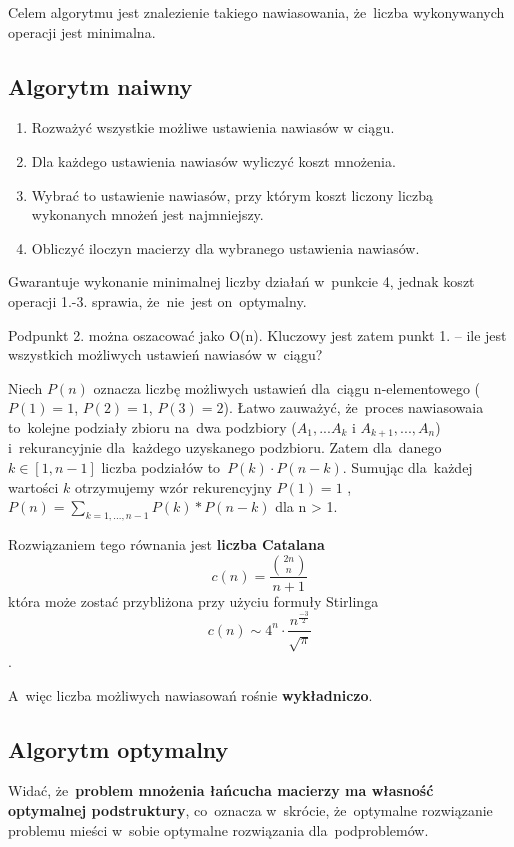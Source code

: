 Celem algorytmu jest znalezienie takiego nawiasowania, że~liczba wykonywanych operacji jest minimalna.

\subsection{Algorytm naiwny}

\begin{enumerate}
 \item Rozważyć wszystkie możliwe ustawienia nawiasów w ciągu.
 \item Dla każdego ustawienia nawiasów wyliczyć koszt mnożenia.
 \item Wybrać to ustawienie nawiasów, przy którym koszt liczony liczbą wykonanych mnożeń jest najmniejszy.
 \item Obliczyć iloczyn macierzy dla wybranego ustawienia nawiasów.
\end{enumerate}
Gwarantuje wykonanie minimalnej liczby działań w~punkcie 4, jednak koszt operacji 1.-3. sprawia, że~nie~jest on~optymalny.

Podpunkt 2. można oszacować jako O(n). Kluczowy jest zatem punkt 1. -- ile jest wszystkich możliwych ustawień nawiasów w~ciągu? 

Niech $P(n)$ oznacza liczbę możliwych ustawień dla~ciągu n-elementowego ($P(1) = 1$, $P(2) = 1$, $P(3) = 2$). Łatwo zauważyć, że~proces nawiasowaia to~kolejne podziały zbioru na~dwa podzbiory ($A_1,...A_k$ i $A_{k+1},...,A_n$) i~rekurancyjnie dla~każdego uzyskanego podzbioru. Zatem dla~danego $k \in [1, n-1]$ liczba podziałów to~$P(k) \cdot P(n - k)$. Sumując dla~każdej wartości $k$ otrzymujemy wzór rekurencyjny $P(1) = 1$ , $P(n) = \sum_{k=1,...,n-1} P(k) * P(n - k)$ dla n > 1.

Rozwiązaniem tego równania jest \textbf{liczba Catalana} $$ c(n) = \frac{{{2n} \choose {n}}}{n+1} $$ która może zostać przybliżona przy użyciu formuły Stirlinga $$ c(n) \sim  4^n \cdot \frac{n^{\frac{-3}{2}}}{\sqrt{\pi}} $$. 

A~więc liczba możliwych nawiasowań rośnie \textbf{wykładniczo}.

\subsection{Algorytm optymalny}

Widać, że~\textbf{problem mnożenia łańcucha macierzy ma własność optymalnej podstruktury}, co~oznacza w~skrócie, że~optymalne rozwiązanie problemu mieści w~sobie optymalne rozwiązania dla~podproblemów.

